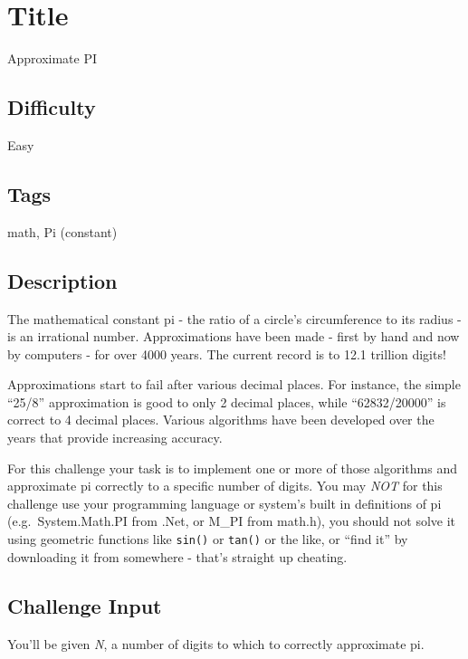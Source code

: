 \section{Title}\label{title}

Approximate PI

\subsection{Difficulty}\label{difficulty}

Easy

\subsection{Tags}\label{tags}

math, Pi (constant)

\subsection{Description}\label{description}

The mathematical constant pi - the ratio of a circle's circumference to
its radius - is an irrational number. Approximations have been made -
first by hand and now by computers - for over 4000 years. The current
record is to 12.1 trillion digits!

Approximations start to fail after various decimal places. For instance,
the simple ``25/8'' approximation is good to only 2 decimal places,
while ``62832/20000'' is correct to 4 decimal places. Various algorithms
have been developed over the years that provide increasing accuracy.

For this challenge your task is to implement one or more of those
algorithms and approximate pi correctly to a specific number of digits.
You may \emph{NOT} for this challenge use your programming language or
system's built in definitions of pi (e.g.~System.Math.PI from .Net, or
M\_PI from math.h), you should not solve it using geometric functions
like \texttt{sin()} or \texttt{tan()} or the like, or ``find it'' by
downloading it from somewhere - that's straight up cheating.

\subsection{Challenge Input}\label{challenge-input}

You'll be given \emph{N}, a number of digits to which to correctly
approximate pi.

